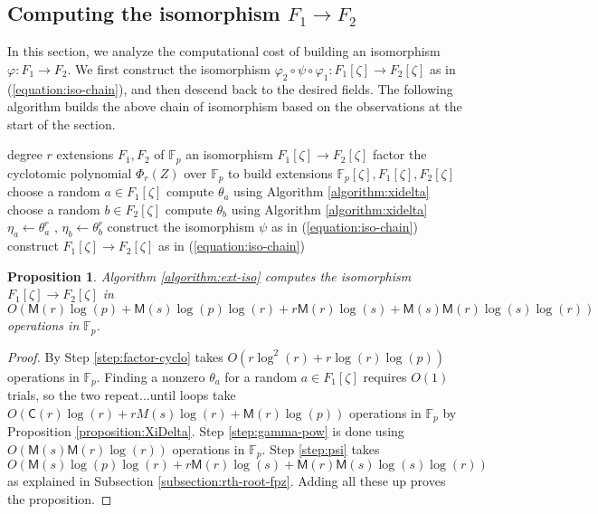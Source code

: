 \documentclass[12pt]{article}
\theoremstyle{plain}
\newtheorem{proposition}[theorem]{Proposition}
\theoremstyle{definition}
\def\F{\mathbb{F}}
\def\M{\mathsf{M}}
\def\CC{\mathsf{C}}
\newcounter{algorithm}
\begin{document}

\subsection{Computing the isomorphism $F_1 \rightarrow F_2$}

In this section, we analyze the computational cost of building an isomorphism $\varphi: F_1 \rightarrow F_2$. We first construct the isomorphism $\varphi_2 \circ \psi \circ \varphi_1 : F_1[\zeta] \rightarrow F_2[\zeta]$ as in (\ref{equation:iso-chain}), and then descend back to the desired fields. The following algorithm builds the above chain of isomorphism based on the observations at the start of the section. 

\begin{algorithm}
\label{algorithm:ext-iso}
	\begin{algorithmic}[1]
		\REQUIRE degree $r$ extensions $F_1, F_2$ of $\F_p$
		\ENSURE an isomorphism $F_1[\zeta] \rightarrow F_2[\zeta]$
		\STATE\label{step:factor-cyclo} factor the cyclotomic polynomial $\Phi_r(Z)$ over $\F_p$ to build extensions $\F_p[\zeta], F_1[\zeta], F_2[\zeta]$
		\REPEAT
			\STATE choose a random $a \in F_1[\zeta]$
			\STATE compute $\theta_a$ using Algorithm \ref{algorithm:xidelta}
		\REPEAT
			\STATE choose a random $b \in F_2[\zeta]$
			\STATE compute $\theta_b$ using Algorithm \ref{algorithm:xidelta}
		\STATE\label{step:gamma-pow} $\eta_a \leftarrow \theta_a^r$ , $\eta_b \leftarrow \theta_b^r$
		\STATE\label{step:psi} construct the isomorphism $\psi$ as in (\ref{equation:iso-chain})
		\STATE construct $F_1[\zeta] \rightarrow F_2[\zeta]$ as in (\ref{equation:iso-chain})
	\end{algorithmic}
\end{algorithm}

\begin{proposition}
	Algorithm \ref{algorithm:ext-iso} computes the isomorphism $F_1[\zeta] \rightarrow F_2[\zeta]$ in
	\[ O(\M(r)\log(p) + \M(s)\log(p)\log(r) + r\M(r)\log(s) + \M(s)\M(r)\log(s)\log(r)) \]
	operations in $\F_p$.
\end{proposition}
\begin{proof}
	By \cite[Theorem 9]{shoup1994fast} Step \ref{step:factor-cyclo} takes $O(r\log^2(r) + r\log(r)\log(p))$ operations in $\F_p$. Finding a nonzero $\theta_a$ for a random $a \in F_1[\zeta]$ requires $O(1)$ trials, so the two repeat...until loops take $O(\CC(r)\log(r) + rM(s)\log(r) + \M(r)\log(p))$ operations in $\F_p$ by Proposition \ref{proposition:XiDelta}. Step \ref{step:gamma-pow} is done using $O(\M(s)\M(r)\log(r))$ operations in $\F_p$. Step \ref{step:psi} takes $O(\M(s)\log(p)\log(r) + r\M(r)\log(s) + \M(r)\M(s)\log(s)\log(r))$ as explained in Subsection \ref{subsection:rth-root-fpz}. Adding all these up proves the proposition.
\end{proof}
\end{document}
